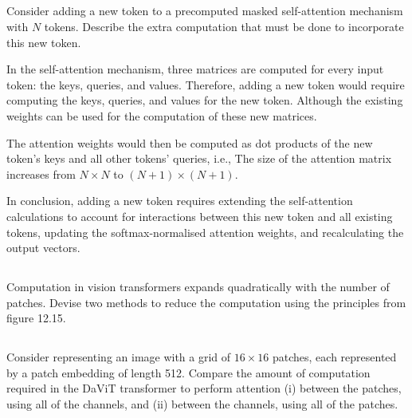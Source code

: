 \documentclass[12pt]{report}
\begin{document}
\subsection{}
\begin{mdframed}
    Consider adding a new token to a precomputed masked self-attention mechanism with $N$ tokens. Describe the extra computation that must be done to incorporate this new token.
\end{mdframed}

In the self-attention mechanism, three matrices are computed for every input token: the keys, queries, and values. Therefore, adding a new token would require computing the keys, queries, and values for the new token. Although the existing weights can be used for the computation of these new matrices.

The attention weights would then be computed as dot products of the new token's keys and all other tokens' queries, i.e., The size of the attention matrix increases from $N \times N$ to $(N+1) \times (N+1)$.

In conclusion, adding a new token requires extending the self-attention calculations to account for interactions between this new token and all existing tokens, updating the softmax-normalised attention weights, and recalculating the output vectors.

\subsection{}
\begin{mdframed}
    Computation in vision transformers expands quadratically with the number of patches. Devise two methods to reduce the computation using the principles from figure 12.15.
\end{mdframed}

\subsection{}
\begin{mdframed}
    Consider representing an image with a grid of $16 \times 16$ patches, each represented by a patch embedding of length 512. Compare the amount of computation required in the DaViT transformer to perform attention (i) between the patches, using all of the channels, and (ii) between the channels, using all of the patches.
\end{mdframed}
\end{document}
